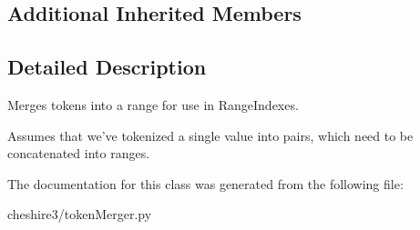 \subsection*{Additional Inherited Members}


\subsection{Detailed Description}
\begin{DoxyVerb}Merges tokens into a range for use in RangeIndexes.

Assumes that we've tokenized a single value into pairs,
which need to be concatenated into ranges.
\end{DoxyVerb}
 

The documentation for this class was generated from the following file\-:\begin{DoxyCompactItemize}
\item 
cheshire3/token\-Merger.\-py\end{DoxyCompactItemize}
